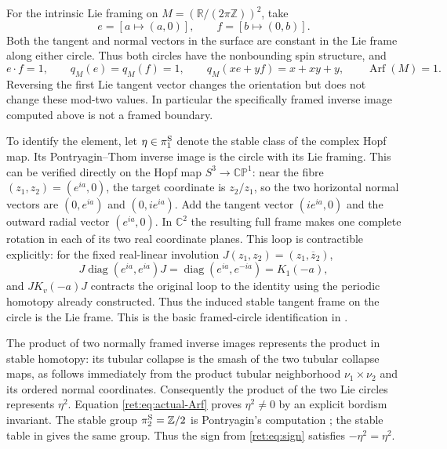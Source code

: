 \documentclass[11pt,letterpaper]{article}
\numberwithin{equation}{section}
\theoremstyle{definition}
\theoremstyle{remark}
\begin{document}
For the intrinsic Lie framing on
\(M=(\mathbb R/(2\pi\mathbb Z))^2\), take
\[
 e=[a\mapsto(a,0)],\qquad f=[b\mapsto(0,b)].
\]
Both the tangent and normal vectors in the surface are constant in
the Lie frame along either circle.  Thus both circles have the
nonbounding spin structure, and
\begin{equation}
 e\mathbin{\cdot}f=1,\qquad q_M(e)=q_M(f)=1,
 \qquad q_M(xe+yf)=x+xy+y,
 \qquad \operatorname{Arf}(M)=1.
 \label{ret:eq:actual-Arf}
\end{equation}
Reversing the first Lie tangent vector changes the orientation but
does not change these mod-two values.  In particular the
specifically framed inverse image computed above is not a framed
boundary.

To identify the element, let \(\eta\in\pi_1^{\rm S}\) denote the
stable class of the complex Hopf map.  Its Pontryagin--Thom inverse
image is the circle with its Lie framing.  This can be verified
directly on the Hopf map \(S^3\to\mathbb{CP}^1\): near the fibre
\((z_1,z_2)=(e^{ia},0)\), the target coordinate is \(z_2/z_1\), so
the two horizontal normal vectors are \((0,e^{ia})\) and
\((0,ie^{ia})\).  Add the tangent vector \((ie^{ia},0)\) and the
outward radial vector \((e^{ia},0)\).  In \(\mathbb C^2\) the resulting
full frame makes one complete rotation in each of its two real
coordinate planes.  This loop is contractible explicitly: for the
fixed real-linear involution \(J(z_1,z_2)=(z_1,\overline z_2)\),
\[
 J\operatorname{diag}(e^{ia},e^{ia})J=\operatorname{diag}(e^{ia},e^{-ia})=K_1(-a),
\]
and \(JK_v(-a)J\) contracts the original loop to the identity using
the periodic homotopy already constructed.  Thus the induced stable
tangent frame on the circle is the Lie frame.  This is the basic
framed-circle identification in \cite{retbib:Pontryagin1955}.

The product of two normally framed inverse images represents the
product in stable homotopy: its tubular collapse is the smash of
the two tubular collapse maps, as follows immediately from the
product tubular neighborhood \(\nu_1\times\nu_2\) and its ordered
normal coordinates.  Consequently the product of the two Lie
circles represents \(\eta^2\).  Equation \eqref{ret:eq:actual-Arf}
proves \(\eta^2\ne0\) by an explicit bordism invariant.  The
stable group \(\pi_2^{\rm S}=\mathbb Z/2\) is Pontryagin's computation
\cite{retbib:Pontryagin1950,retbib:Pontryagin1955}; the stable table in
\cite[pp.~384--385]{retbib:Hatcher} gives the same group.  Thus the sign from
\eqref{ret:eq:sign} satisfies \(-\eta^2=\eta^2\).
\end{document}
